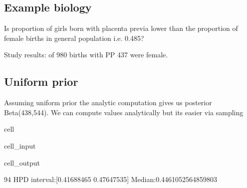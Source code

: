 \documentclass[letterpaper,10pt,english]{jupyterBook}
\begin{document}
\subsection{Example \sphinxhyphen{} biology}
\label{\detokenize{Lecture 2:example-biology}}
\sphinxAtStartPar
Is proportion of girls born with placenta previa lower than the proportion of female births in general population i.e. 0.485?

\sphinxAtStartPar
Study results: of 980 births with PP 437 were female.



\subsection{Uniform prior}
\label{\detokenize{Lecture 2:uniform-prior}}
\sphinxAtStartPar
Assuming uniform prior the analytic computation gives us posterior Beta(438,544). We can compute values analytically but its easier via sampling

\begin{sphinxuseclass}{cell}\begin{sphinxVerbatimInput}

\begin{sphinxuseclass}{cell_input}
\begin{sphinxVerbatim}[commandchars=\\\{\}]
   

\end{sphinxVerbatim}

\end{sphinxuseclass}\end{sphinxVerbatimInput}
\begin{sphinxVerbatimOutput}

\begin{sphinxuseclass}{cell_output}
\begin{sphinxVerbatim}[commandchars=\\\{\}]
94\PYGZpc{} HPD interval:[0.41688465 0.47647535]
Median:0.4461052564859803
\end{sphinxVerbatim}

\end{sphinxuseclass}\end{sphinxVerbatimOutput}

\end{sphinxuseclass}
\end{document}
